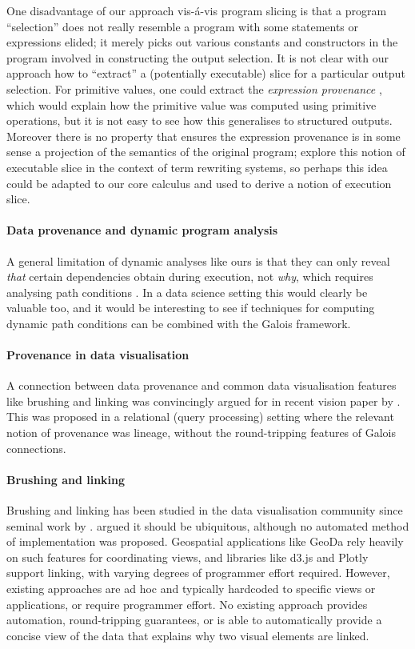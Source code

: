 One disadvantage of our approach vis-\'a-vis program slicing is that a program ``selection'' does not really resemble a program with some statements or expressions elided; it merely picks out various constants and constructors in the program involved in constructing the output selection. It is not clear with our approach how to ``extract'' a (potentially executable) slice for a particular output selection. For primitive values, one could extract the \emph{expression provenance} \cite{acar12}, which would explain how the primitive value was computed using primitive operations, but it is not easy to see how this generalises to structured outputs. Moreover there is no property that ensures the expression provenance is in some sense a projection of the semantics of the original program; \citet{field98} explore this notion of executable slice in the context of term rewriting systems, so perhaps this idea could be adapted to our core calculus and used to derive a notion of execution slice.

\paragraph{Data provenance and dynamic program analysis}

A general limitation of dynamic analyses like ours is that they can only reveal \emph{that} certain dependencies obtain during execution, not \emph{why}, which requires analysing path conditions \cite{hammer06}. In a data science setting this would clearly be valuable too, and it would be interesting to see if techniques for computing dynamic path conditions can be combined with the Galois framework.

\paragraph{Provenance in data visualisation}

A connection between data provenance and common data visualisation features like brushing and linking was convincingly argued for in recent vision paper by \citet{psallidas18}. This was proposed in a relational (query processing) setting where the relevant notion of provenance was lineage, without the round-tripping features of Galois connections.

\paragraph{Brushing and linking}

Brushing and linking has been studied in the data visualisation community since seminal work by \citet{becker87}. \citet{roberts06} argued it should be ubiquitous, although no automated method of implementation was proposed. Geospatial applications like GeoDa \cite{anselin06} rely heavily on such features for coordinating views, and libraries like d3.js and Plotly support linking, with varying degrees of programmer effort required. However, existing approaches are ad hoc and typically hardcoded to specific views or applications, or require programmer effort. No existing approach provides automation, round-tripping guarantees, or is able to automatically provide a concise view of the data that explains why two visual elements are linked.
